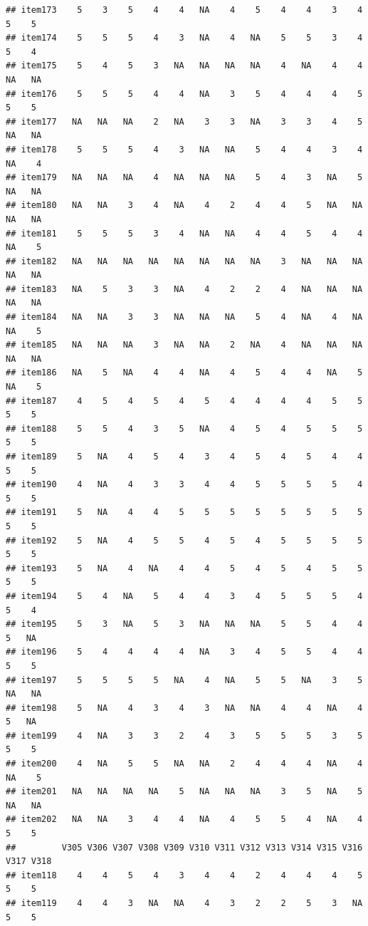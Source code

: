 \documentclass[
  man]{apa6}
\begin{document}
\begin{verbatim}
## item173    5    3    5    4    4   NA    4    5    4    4    3    4    5    5
## item174    5    5    5    4    3   NA    4   NA    5    5    3    4    5    4
## item175    5    4    5    3   NA   NA   NA   NA    4   NA    4    4   NA   NA
## item176    5    5    5    4    4   NA    3    5    4    4    4    5    5    5
## item177   NA   NA   NA    2   NA    3    3   NA    3    3    4    5   NA   NA
## item178    5    5    5    4    3   NA   NA    5    4    4    3    4   NA    4
## item179   NA   NA   NA    4   NA   NA   NA    5    4    3   NA    5   NA   NA
## item180   NA   NA    3    4   NA    4    2    4    4    5   NA   NA   NA   NA
## item181    5    5    5    3    4   NA   NA    4    4    5    4    4   NA    5
## item182   NA   NA   NA   NA   NA   NA   NA   NA    3   NA   NA   NA   NA   NA
## item183   NA    5    3    3   NA    4    2    2    4   NA   NA   NA   NA   NA
## item184   NA   NA    3    3   NA   NA   NA    5    4   NA    4   NA   NA    5
## item185   NA   NA   NA    3   NA   NA    2   NA    4   NA   NA   NA   NA   NA
## item186   NA    5   NA    4    4   NA    4    5    4    4   NA    5   NA    5
## item187    4    5    4    5    4    5    4    4    4    4    5    5    5    5
## item188    5    5    4    3    5   NA    4    5    4    5    5    5    5    5
## item189    5   NA    4    5    4    3    4    5    4    5    4    4    5    5
## item190    4   NA    4    3    3    4    4    5    5    5    5    4    5    5
## item191    5   NA    4    4    5    5    5    5    5    5    5    5    5    5
## item192    5   NA    4    5    5    4    5    4    5    5    5    5    5    5
## item193    5   NA    4   NA    4    4    5    4    5    4    5    5    5    5
## item194    5    4   NA    5    4    4    3    4    5    5    5    4    5    4
## item195    5    3   NA    5    3   NA   NA   NA    5    5    4    4    5   NA
## item196    5    4    4    4    4   NA    3    4    5    5    4    4    5    5
## item197    5    5    5    5   NA    4   NA    5    5   NA    3    5   NA   NA
## item198    5   NA    4    3    4    3   NA   NA    4    4   NA    4    5   NA
## item199    4   NA    3    3    2    4    3    5    5    5    3    5    5    5
## item200    4   NA    5    5   NA   NA    2    4    4    4   NA    4   NA    5
## item201   NA   NA   NA   NA    5   NA   NA   NA    3    5   NA    5   NA   NA
## item202   NA   NA    3    4    4   NA    4    5    5    4   NA    4    5    5
##         V305 V306 V307 V308 V309 V310 V311 V312 V313 V314 V315 V316 V317 V318
## item118    4    4    5    4    3    4    4    2    4    4    4    5    5    5
## item119    4    4    3   NA   NA    4    3    2    2    5    3   NA    5    5

\end{verbatim}
\end{document}
